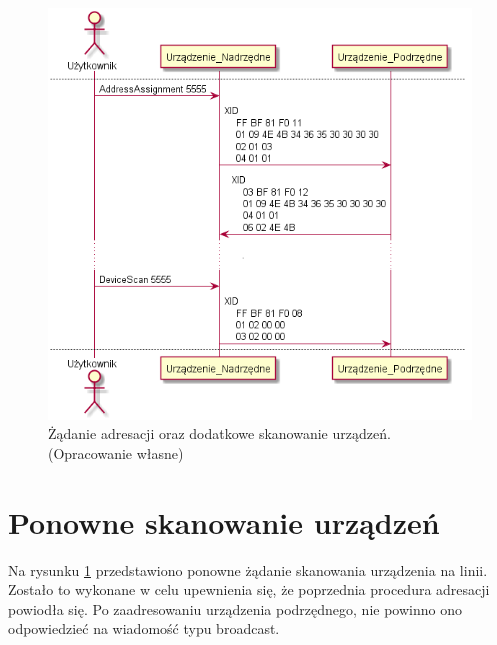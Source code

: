 \begin{figure}[h!]
    \centering
    \includegraphics[scale=0.75]{out/Diagramy/UML_DiagramOfSequence_New/UML_DiagramOfSequence_New-page2.png}
    \caption{Żądanie adresacji oraz dodatkowe skanowanie urządzeń.
        \newline(Opracowanie własne)}
    \label{fig:DiagramSequence_AddressAssignment_SecondDeviceScan}
\end{figure}


\section{Ponowne skanowanie urządzeń}
Na rysunku \ref{fig:DiagramSequence_AddressAssignment_SecondDeviceScan} przedstawiono ponowne żądanie skanowania urządzenia na linii.
Zostało to wykonane w celu upewnienia się, że poprzednia procedura adresacji powiodła się. Po zaadresowaniu urządzenia podrzędnego, nie powinno
ono odpowiedzieć na wiadomość typu broadcast.

